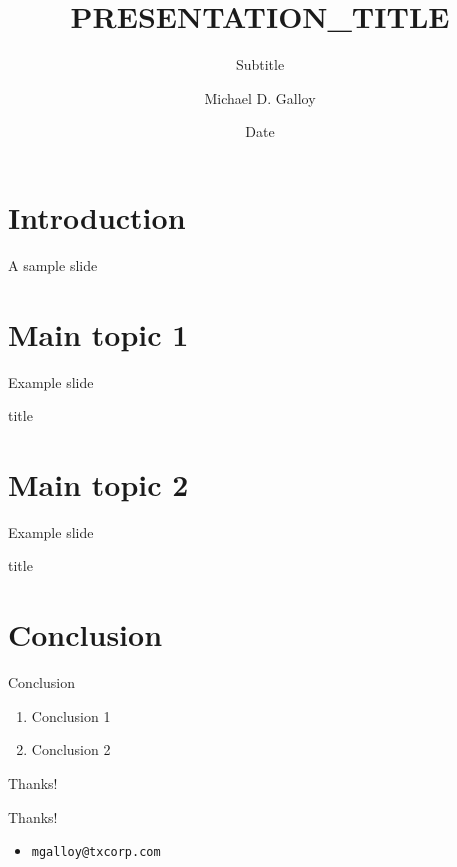 \documentclass{beamer}
\title{PRESENTATION_TITLE}
\subtitle{Subtitle}
\author{Michael D. Galloy}
\institute[Tech-X Corporation]{}
\date{Date}
\begin{document}
\begin{frame}[plain]
  \titlepage
\end{frame}


\section{Introduction}


\begin{frame}{A sample slide}
\end{frame}


\section{Main topic 1}


\begin{frame}{Example slide}
\end{frame}

\begin{frame}{title}
\end{frame}


\section{Main topic 2}


\begin{frame}{Example slide}
\end{frame}

\begin{frame}{title}
\end{frame}


\section{Conclusion}


\begin{frame}{Conclusion}
  \begin{enumerate}
    \item Conclusion 1
    \item Conclusion 2
  \end{enumerate}
\end{frame}

\begin{frame}{Thanks!}
  \begin{center}{\huge Thanks!}\end{center}
  \begin{itemize}
    \item {\tt mgalloy@txcorp.com}
  \end{itemize}
\end{frame}
\end{document}
